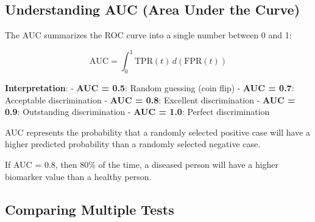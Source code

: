 \documentclass[
  11pt,
  letterpaper,
  oneside]{book}
\begin{document}
\subsection{Understanding AUC (Area Under the
Curve)}\label{understanding-auc-area-under-the-curve}

The AUC summarizes the ROC curve into a single number between 0 and 1:

\[\text{AUC} = \int_0^1 \text{TPR}(t) \, d(\text{FPR}(t))\]

\textbf{Interpretation}: - \textbf{AUC = 0.5}: Random guessing (coin
flip) - \textbf{AUC = 0.7}: Acceptable discrimination - \textbf{AUC =
0.8}: Excellent discrimination - \textbf{AUC = 0.9}: Outstanding
discrimination - \textbf{AUC = 1.0}: Perfect discrimination

\begin{tcolorbox}[enhanced jigsaw, toprule=.15mm, left=2mm, opacitybacktitle=0.6, colframe=quarto-callout-tip-color-frame, leftrule=.75mm, titlerule=0mm, coltitle=black, colbacktitle=quarto-callout-tip-color!10!white, toptitle=1mm, title=\textcolor{quarto-callout-tip-color}{\faLightbulb}\hspace{0.5em}{Intuitive AUC Interpretation}, bottomtitle=1mm, arc=.35mm, rightrule=.15mm, bottomrule=.15mm, breakable, opacityback=0, colback=white]

AUC represents the probability that a randomly selected positive case
will have a higher predicted probability than a randomly selected
negative case.

If AUC = 0.8, then 80\% of the time, a diseased person will have a
higher biomarker value than a healthy person.

\end{tcolorbox}

\subsection{Comparing Multiple Tests}\label{comparing-multiple-tests}
\end{document}
